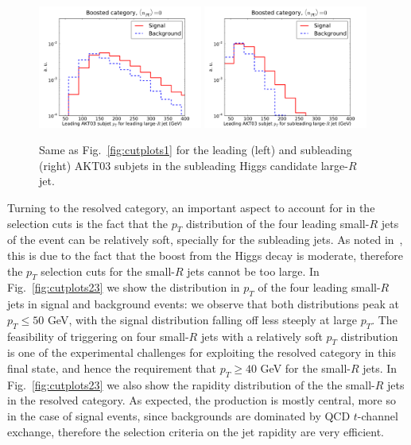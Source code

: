 \begin{figure}[t]
\begin{center}
 \includegraphics[width=0.48\textwidth]{plots/pt_leadSJ_fj2_noPU.pdf}
 \includegraphics[width=0.48\textwidth]{plots/pt_subleadSJ_fj2_noPU.pdf}
 \caption{\small  Same as Fig.~\ref{fig:cutplots1} for the leading (left)
   and subleading (right) AKT03
   subjets in the subleading Higgs candidate large-$R$ jet.
}
\label{fig:cutplots22}
\end{center}
\end{figure}


Turning to the resolved category, an important aspect to account for
in the  selection
cuts is the fact that the $p_T$ distribution
of the four leading small-$R$ jets of the event can be relatively soft,
specially for the subleading jets.
%
As noted in~\cite{deLima:2014dta}, this is due to the fact
that the boost from the Higgs decay is moderate,
therefore the $p_T$ selection cuts for the small-$R$ jets cannot be too large.
%
In Fig.~\ref{fig:cutplots23}
we show the distribution in $p_T$ of the four leading
small-$R$ jets in signal and background events: we observe that both
distributions peak at $p_T \le 50$ GeV, with the signal distribution
falling off less steeply at large $p_T$.
%
The feasibility of triggering on four small-$R$ jets with a relatively
soft $p_T$ distribution is one of the experimental challenges for
exploiting the resolved category in this final state,
and hence the requirement that $p_T \ge 40$ GeV for
the small-$R$ jets.
%
In  Fig.~\ref{fig:cutplots23} we also show the
rapidity distribution of the the small-$R$
jets in the resolved category.
%
As expected, the production
is mostly central, more so in the case
of signal events, since backgrounds are dominated by
QCD $t$-channel exchange, therefore the
selection criteria on the jet rapidity are very efficient.


